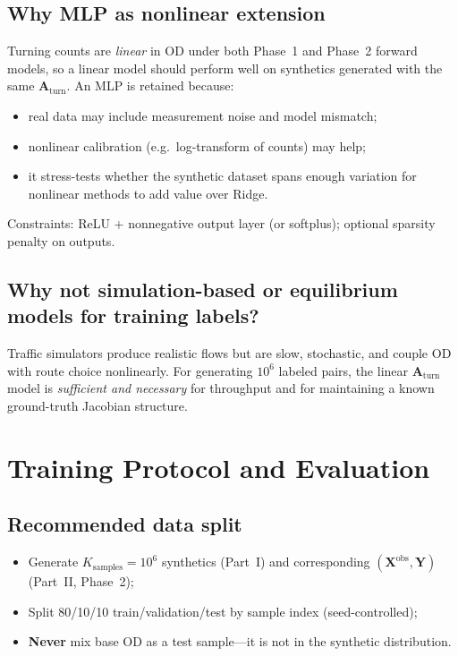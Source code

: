 \documentclass[11pt,a4paper]{report}
\newcommand{\mathbfX}{\mathbf{X}}
\newcommand{\mathbfY}{\mathbf{Y}}
\newcommand{\Aturn}{\mathbf{A}_{\mathrm{turn}}}
\begin{document}
\section{Why MLP as nonlinear extension}

Turning counts are \emph{linear} in OD under both Phase~1 and Phase~2 forward models, so a linear model should perform well on synthetics generated with the same $\Aturn$. An MLP is retained because:
\begin{itemize}[noitemsep]
    \item real data may include measurement noise and model mismatch;
    \item nonlinear calibration (e.g.\ log-transform of counts) may help;
    \item it stress-tests whether the synthetic dataset spans enough variation for nonlinear methods to add value over Ridge.
\end{itemize}
Constraints: ReLU + nonnegative output layer (or softplus); optional sparsity penalty on outputs.

\section{Why not simulation-based or equilibrium models for training labels?}

Traffic simulators produce realistic flows but are slow, stochastic, and couple OD with route choice nonlinearly. For generating $10^6$ labeled pairs, the linear $\Aturn$ model is \emph{sufficient and necessary} for throughput and for maintaining a known ground-truth Jacobian structure.


\chapter{Training Protocol and Evaluation}
\label{ch:training}

\section{Recommended data split}

\begin{itemize}[noitemsep]
    \item Generate $K_{\mathrm{samples}}=10^6$ synthetics (Part~I) and corresponding $(\mathbfX^{\mathrm{obs}},\mathbfY)$ (Part~II, Phase~2);
    \item Split 80/10/10 train/validation/test by sample index (seed-controlled);
    \item \textbf{Never} mix base OD as a test sample---it is not in the synthetic distribution.
\end{itemize}
\end{document}
